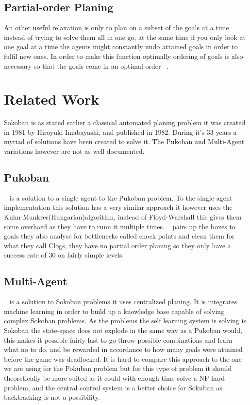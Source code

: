 \documentclass[letterpaper]{article}
\begin{document}
	\subsection{Partial-order Planing}
		An other useful relaxation is only to plan on a subset of the goals at a time instead of trying to solve them all in one go, at the same time if you only look at one goal at a time the agents might constantly undo attained goals in order to fulfil new ones. In order to make this function optimally ordering of goals is also necessary so that the goals come in an optimal order ~\cite{Subgoals}.

\section{Related Work}
	Sokoban is as stated earlier a classical automated planing problem it was created in 1981 by Hiroyuki Imabayashi, and published in 1982. During it's 33 years a myriad of solutions have been created to solve it.
	The Pukoban and Multi-Agent variations however are not as well documented.
	\subsection{Pukoban}
		~\cite[Agent motion planning with pull and push moves]{Pukoban} is a solution to a single agent to the Pukoban problem. To the single agent implementation this solution has a very similar approach it however uses the Kuhn-Munkres(Hungarian)algorithm, instead of Floyd-Warshall this gives them some overhaed as they have to runn it multiple times.
		~\cite{Pukoban} pairs up the boxes to goals they also analyse for bottlenecks called chock points and clean them for what they call Clogs, they have no partial order planing   so they only have a success rate of 30 on fairly simple levels.
		\subsection{Multi-Agent}
		~\cite[A Multi-Agent Planning Approach Integrated with Learning Mechanism]{Multi-Agent} is a solution to Sokoban problems it uses centralized planing. It is integrates machine learning in order to build up a knowledge base capable of solving complex Sokoban problems. As the problems the self learning system is solving is Sokoban the state-space does not explode in the same way as a Pukoban would, this makes it possible fairly fast to go throw possible combinations and learn what no to do, and be rewarded in accordance to how many goals were attained before the game was deadlocked. It is hard to compare this approach to the one we are using for the Pokuban problem but for this type of problem it should theoretically be more suited as it could with enough time solve a NP-hard problem, and the central control system is a better choice for Sokuban as backtracking is not a possibility.
\end{document}

